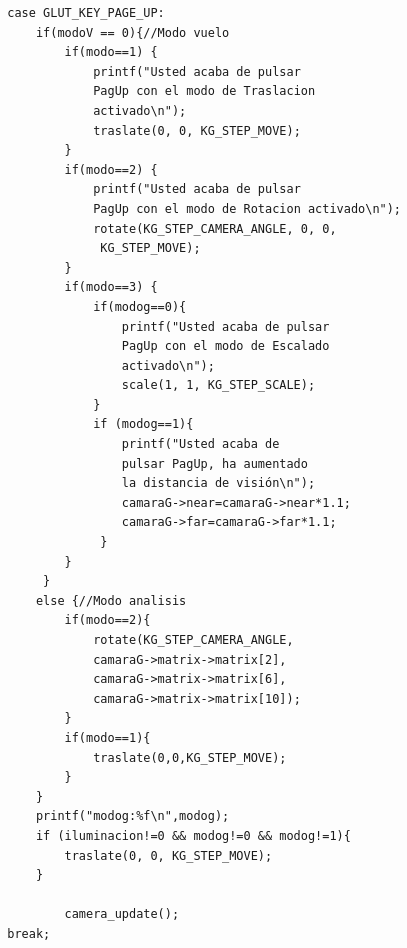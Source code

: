 \documentclass[12pt,a4paper]{article}
\begin{document}
\begin{enumerate}
\begin{lstlisting}
        case GLUT_KEY_PAGE_UP:
        	if(modoV == 0){//Modo vuelo
                if(modo==1) {
                    printf("Usted acaba de pulsar
                    PagUp con el modo de Traslacion
                    activado\n");
                    traslate(0, 0, KG_STEP_MOVE);
                }
                if(modo==2) {
                    printf("Usted acaba de pulsar 
                    PagUp con el modo de Rotacion activado\n");
                    rotate(KG_STEP_CAMERA_ANGLE, 0, 0,
                     KG_STEP_MOVE);
                }
               	if(modo==3) {
               		if(modog==0){
                    	printf("Usted acaba de pulsar
                    	PagUp con el modo de Escalado
                    	activado\n");
                    	scale(1, 1, KG_STEP_SCALE);
                    }
                    if (modog==1){
                     	printf("Usted acaba de
                     	pulsar PagUp, ha aumentado
                     	la distancia de visión\n");
                		camaraG->near=camaraG->near*1.1;
                		camaraG->far=camaraG->far*1.1;
                     } 
                }
             }
            else {//Modo analisis
             	if(modo==2){
             		rotate(KG_STEP_CAMERA_ANGLE,
             		camaraG->matrix->matrix[2],
             		camaraG->matrix->matrix[6],
             		camaraG->matrix->matrix[10]);
             	}
             	if(modo==1){
             		traslate(0,0,KG_STEP_MOVE);
             	}
            }
            printf("modog:%f\n",modog);
            if (iluminacion!=0 && modog!=0 && modog!=1){
        		traslate(0, 0, KG_STEP_MOVE);
        	}

                camera_update();
        break;


\end{lstlisting}
\end{enumerate}
\end{document}

